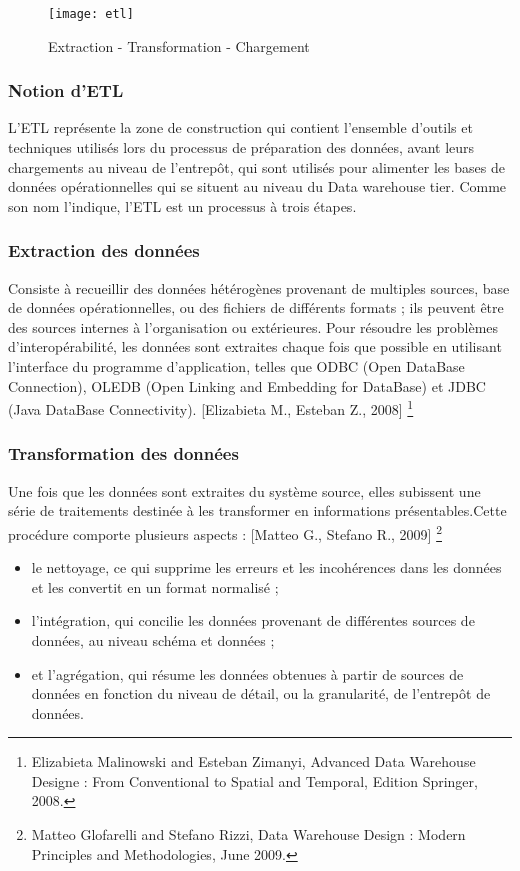 \begin{figure}[H]
    \centering
    \texttt{[image: etl]}
    \caption{Extraction - Transformation - Chargement}
    \label{fig:etl}
\end{figure}

\subsubsection{Notion d’ETL}
L'ETL représente la zone de construction qui contient l’ensemble d’outils et techniques utilisés lors du processus de préparation des données, avant leurs chargements au niveau de l’entrepôt, qui sont utilisés pour alimenter les bases de données opérationnelles qui se situent au niveau du Data warehouse tier. Comme son nom l’indique, l’ETL est un processus à trois étapes.

\subsubsection{Extraction des données}
Consiste à recueillir des données hétérogènes provenant de multiples sources, base de données opérationnelles, ou des fichiers de différents formats ; ils peuvent être des sources internes à l’organisation ou extérieures. Pour résoudre les problèmes d’interopérabilité, les données sont extraites chaque fois que possible en utilisant l’interface du programme d’application, telles que ODBC (Open DataBase Connection), OLEDB (Open Linking and Embedding for DataBase) et JDBC (Java DataBase Connectivity). [Elizabieta M., Esteban Z., 2008] \footnote{Elizabieta Malinowski and Esteban Zimanyi, Advanced Data Warehouse Designe : From
Conventional to Spatial and Temporal, Edition Springer, 2008.}

\subsubsection{Transformation des données}
Une fois que les données sont extraites du système source, elles subissent une série de traitements destinée à les transformer en informations présentables.Cette procédure comporte plusieurs aspects : [Matteo G., Stefano R., 2009] \footnote{Matteo Glofarelli and Stefano Rizzi, Data Warehouse Design : Modern Principles and
Methodologies, June 2009.}
\begin{itemize}
    \item le nettoyage, ce qui supprime les erreurs et les incohérences dans les données et les convertit en un format normalisé ; 
    \item l’intégration, qui concilie les données provenant de différentes sources de données, au niveau schéma et données ; 
    \item et l’agrégation, qui résume les données obtenues à partir de sources de données en fonction du niveau de détail, ou la granularité, de l’entrepôt de données.
\end{itemize}

